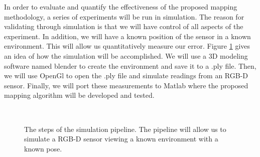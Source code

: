 \documentclass[12pt]{article}
\begin{document}
In order to evaluate and quantify the effectiveness of the proposed mapping
methodology, a series of experiments will be run in simulation.  The reason
for validating through simulation is that we will have control of all
aspects of the experiment. In addition, we will have a known position of
the sensor in a known environment. This will allow us quantitatively measure
our error. Figure \ref{fig:Sim} gives an idea of how the simulation will be
accomplished. We will use a 3D modeling software named blender to create the
environment and save it to a .ply file. Then, we will use OpenGl to open
the .ply file and simulate readings from an RGB-D sensor. Finally, we will
port these measurements to Matlab where the proposed mapping algorithm will
be developed and tested. 

\begin{figure}[h]
\centering
{} \quad
{} \quad
{} \\
\caption{The steps of the simulation pipeline. The pipeline will allow
us to simulate a RGB-D sensor viewing a known environment with a known
pose.}
\label{fig:Sim}
\end{figure}
\end{document}
